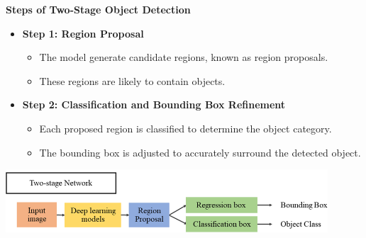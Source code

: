 \documentclass{beamer}
\begin{document}
\begin{frame}{\textbf{Steps of Two-Stage Object Detection}}
  \begin{itemize}
    \item \textbf{Step 1: Region Proposal}
    \begin{itemize}
      \item The model generate candidate regions, known as region proposals.
      \item These regions are likely to contain objects.
    \end{itemize}
    
    \item \textbf{Step 2: Classification and Bounding Box Refinement}
    \begin{itemize}
      \item Each proposed region is classified to determine the object category.
      \item The bounding box is adjusted to accurately surround the detected object.
    \end{itemize}
  \end{itemize}
  
  \vfill
  \begin{center}
    \includegraphics[width=0.9\textwidth]{slide3.png}
  \end{center}
\end{frame}
\end{document}
